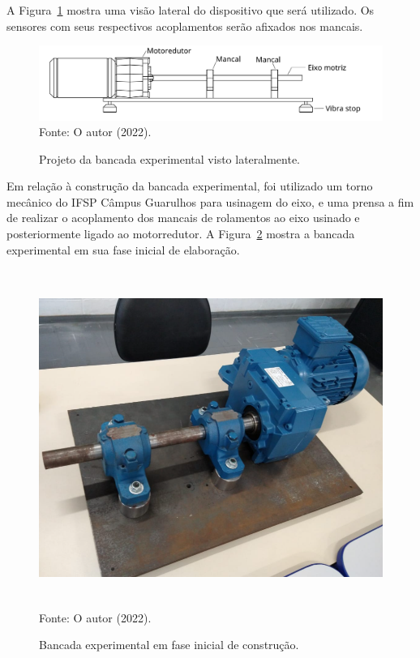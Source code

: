 \documentclass[
	12pt,				
	oneside,			
	a4paper,			
	english,			
	brazil,			
	]{abntex2ppgsi}
\begin{document}
A Figura~\ref{dispositivo_teste_visto_de_lado} mostra uma visão lateral do dispositivo que será utilizado. Os sensores com seus respectivos acoplamentos serão afixados nos mancais. 

\begin{figure}[H]
\centering
\caption {Projeto da bancada experimental visto lateralmente.}
\includegraphics[width=\textwidth,height=\textheight,keepaspectratio]{dispositivo_teste_visto_de_lado} \\
Fonte: O autor (2022).
\label{dispositivo_teste_visto_de_lado}
\end{figure}

Em relação à construção da bancada experimental, foi utilizado um torno mecânico do IFSP Câmpus Guarulhos para usinagem do eixo, e uma prensa a fim de realizar o acoplamento dos mancais de rolamentos ao eixo usinado e posteriormente ligado ao motorredutor. A Figura~\ref{bancada_de_testes} mostra a bancada experimental em sua fase inicial de elaboração.

\begin{figure}[H]
\centering
\caption {Bancada experimental em fase inicial de construção.}
\includegraphics[width=\textwidth,height=110mm,keepaspectratio]{bancada_de_testes} \\
Fonte: O autor (2022).
\label{bancada_de_testes}
\end{figure}
\end{document}

